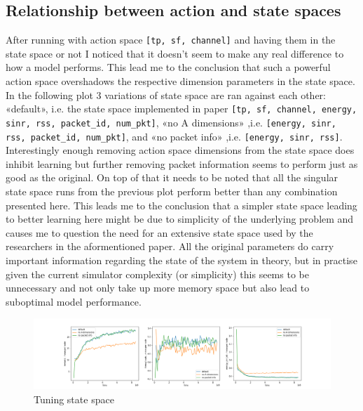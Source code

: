 \subsection{Relationship between action and state spaces}
After running with action space \texttt{[tp, sf, channel]}
and having them in the state space or not I noticed
that it doesn't seem to make any real difference to 
how a model performs. This lead me to the 
conclusion that such a powerful action space
overshadows the respective dimension parameters in
the state space. \\

In the following plot 3 variations of state space
are ran against each other: «default», i.e. the state space implemented in paper \cite{rl_lora_original}
\texttt{[tp, sf, channel, energy, sinr, rss, packet\_id, 
num\_pkt]}, «no A dimensions» ,i.e. \texttt{[energy, sinr, rss, packet\_id, num\_pkt]}, and «no packet info» ,i.e. \texttt{[energy, sinr, rss]}.
Interestingly enough removing action space dimensions
from the state space does inhibit learning but further
removing packet information seems to perform just
as good as the original. On top of that it needs to be
noted that all the singular state space runs from the 
previous plot perform better than any combination 
presented here. This leads me to the conclusion 
that a simpler state space leading to better learning 
here might be due to simplicity of the underlying
problem and causes me to question the need for an
extensive state space used by the researchers in the
aformentioned paper. All the original parameters do carry 
important information regarding the state of the system in theory, but in practise given the current simulator complexity 
(or simplicity) this seems to be unnecessary and not only take up
more memory space but also lead to suboptimal model performance.

\begin{figure}[H]
\centering
\hspace*{-3.3cm}  
\includegraphics[scale=0.40]{plots/state_space/state_space_SMALL.png}
  \caption{Tuning state space}
\end{figure}


